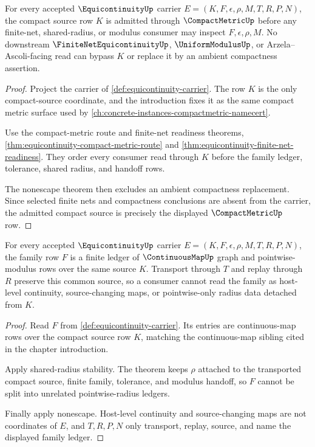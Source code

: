 \begin{theorem}
\label{thm:equicontinuity-compact-source-admission}
For every accepted $\EquicontinuityUp$ carrier $E=(K,F,\epsilon,\rho,M,T,R,P,N)$, the compact source row $K$ is admitted through $\CompactMetricUp$ before any finite-net, shared-radius, or modulus consumer may inspect $F,\epsilon,\rho,M$. No downstream $\FiniteNetEquicontinuityUp$, $\UniformModulusUp$, or Arzela--Ascoli-facing read can bypass $K$ or replace it by an ambient compactness assertion.
\end{theorem}
\begin{proof}
Project the carrier of \autoref{def:equicontinuity-carrier}. The row $K$ is the only compact-source coordinate, and the introduction fixes it as the same compact metric surface used by \autoref{ch:concrete-instances-compactmetric-namecert}.

Use the compact-metric route and finite-net readiness theorems, \autoref{thm:equicontinuity-compact-metric-route} and \autoref{thm:equicontinuity-finite-net-readiness}. They order every consumer read through $K$ before the family ledger, tolerance, shared radius, and handoff rows.

The nonescape theorem then excludes an ambient compactness replacement. Since selected finite nets and compactness conclusions are absent from the carrier, the admitted compact source is precisely the displayed $\CompactMetricUp$ row.
\end{proof}

\begin{theorem}
\label{thm:equicontinuity-continuous-family-admission}
For every accepted $\EquicontinuityUp$ carrier $E=(K,F,\epsilon,\rho,M,T,R,P,N)$, the family row $F$ is a finite ledger of $\ContinuousMapUp$ graph and pointwise-modulus rows over the same source $K$. Transport through $T$ and replay through $R$ preserve this common source, so a consumer cannot read the family as host-level continuity, source-changing maps, or pointwise-only radius data detached from $K$.
\end{theorem}
\begin{proof}
Read $F$ from \autoref{def:equicontinuity-carrier}. Its entries are continuous-map rows over the compact source row $K$, matching the continuous-map sibling cited in the chapter introduction.

Apply shared-radius stability. The theorem keeps $\rho$ attached to the transported compact source, finite family, tolerance, and modulus handoff, so $F$ cannot be split into unrelated pointwise-radius ledgers.

Finally apply nonescape. Host-level continuity and source-changing maps are not coordinates of $E$, and $T,R,P,N$ only transport, replay, source, and name the displayed family ledger.
\end{proof}

